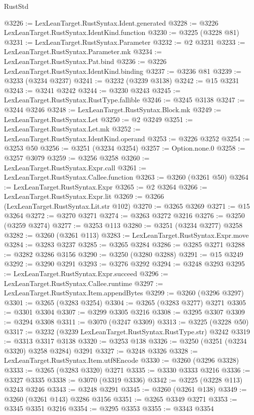 \begin{lexlean}{RustStd}
\begin{coremodule}
@3226 := LexLeanTarget.RustSyntax.Ident.generated
@3228 := @3226 LexLeanTarget.RustSyntax.IdentKind.function
@3230 := @3225 (@3228 @81)
@3231 := LexLeanTarget.RustSyntax.Parameter
@3232 := @2 @3231
@3233 := LexLeanTarget.RustSyntax.Parameter.mk
@3234 := LexLeanTarget.RustSyntax.Pat.bind
@3236 := @3226 LexLeanTarget.RustSyntax.IdentKind.binding
@3237 := @3236 @81
@3239 := @3233 (@3234 @3237)
@3241 := @3232 (@3239 @3138)
@3242 := @15 @3231
@3243 := @3241 @3242
@3244 := @3230 @3243
@3245 := LexLeanTarget.RustSyntax.RustType.fallible
@3246 := @3245 @3138
@3247 := @3244 @3246
@3248 := LexLeanTarget.RustSyntax.Block.mk
@3249 := LexLeanTarget.RustSyntax.Let
@3250 := @2 @3249
@3251 := LexLeanTarget.RustSyntax.Let.mk
@3252 := LexLeanTarget.RustSyntax.IdentKind.operand
@3253 := @3226 @3252
@3254 := @3253 @50
@3256 := @3251 (@3234 @3254)
@3257 := Option.none.{0}
@3258 := @3257 @3079
@3259 := @3256 @3258
@3260 := LexLeanTarget.RustSyntax.Expr.call
@3261 := LexLeanTarget.RustSyntax.Callee.function
@3263 := @3260 (@3261 @50)
@3264 := LexLeanTarget.RustSyntax.Expr
@3265 := @2 @3264
@3266 := LexLeanTarget.RustSyntax.Expr.lit
@3269 := @3266 (LexLeanTarget.RustSyntax.Lit.str @102)
@3270 := @3265 @3269
@3271 := @15 @3264
@3272 := @3270 @3271
@3274 := @3263 @3272 @3216
@3276 := @3250 (@3259 @3274)
@3277 := @3253 @113
@3280 := @3251 (@3234 @3277) @3258
@3282 := @3260 (@3261 @113)
@3283 := LexLeanTarget.RustSyntax.Expr.move
@3284 := @3283 @3237
@3285 := @3265 @3284
@3286 := @3285 @3271
@3288 := @3282 @3286 @3156
@3290 := @3250 (@3280 @3288)
@3291 := @15 @3249
@3292 := @3290 @3291
@3293 := @3276 @3292
@3294 := @3248 @3293
@3295 := LexLeanTarget.RustSyntax.Expr.succeed
@3296 := LexLeanTarget.RustSyntax.Callee.runtime
@3297 := LexLeanTarget.RustSyntax.Item.appendBytes
@3299 := @3260 (@3296 @3297)
@3301 := @3265 (@3283 @3254)
@3304 := @3265 (@3283 @3277) @3271
@3305 := @3301 @3304
@3307 := @3299 @3305 @3216
@3308 := @3295 @3307
@3309 := @3294 @3308
@3311 := @3070 (@3247 @3309)
@3313 := @3225 (@3228 @50)
@3317 := @3232 (@3239 LexLeanTarget.RustSyntax.RustType.str) @3242
@3319 := @3313 @3317 @3138
@3320 := @3253 @138
@3326 := @3250 (@3251 (@3234 @3320) @3258 @3284) @3291
@3327 := @3248 @3326
@3328 := LexLeanTarget.RustSyntax.Item.utf8Encode
@3330 := @3260 (@3296 @3328)
@3333 := @3265 (@3283 @3320) @3271
@3335 := @3330 @3333 @3216
@3336 := @3327 @3335
@3338 := @3070 (@3319 @3336)
@3342 := @3225 (@3228 @113) @3243 @3246
@3343 := @3248 @3291
@3345 := @3260 (@3261 @138)
@3349 := @3260 (@3261 @143) @3286 @3156
@3351 := @3265 @3349 @3271
@3353 := @3345 @3351 @3216
@3354 := @3295 @3353
@3355 := @3343 @3354

\end{coremodule}
\end{lexlean}
